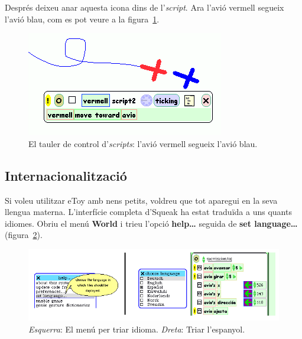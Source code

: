 Després deixeu anar aquesta icona dins de l'\emph{script}. Ara l'avió vermell segueix l'avió blau, com es pot veure a la figura~\ref{fig2452}.
\begin{figure}[h!]
\begin{center}
\includegraphics[scale=0.6]{Imatges/figura24-52}
\end{center}
\caption{El tauler de control d'\emph{scripts}: l'avió vermell segueix l'avió blau.}
\label{fig2452}
\end{figure}

\subsection{Internacionalització}
Si voleu utilitzar eToy amb nens petits, voldreu que tot aparegui en la seva llengua materna. L'interfície completa d'Squeak ha estat traduïda a uns quants idiomes. Obriu el menú \textbf{World} i trieu l'opció \textbf{help\dots} seguida de \textbf{set language\dots} (figura~\ref{fig2453}). 
\begin{figure}[h!]
\begin{center}
\includegraphics[scale=2]{Imatges/figura24-53i54}
\end{center}
\caption{\emph{Esquerra}: El menú per triar idioma.
\emph{Dreta}: Triar l'espanyol.}
\label{fig2453}
\end{figure}

